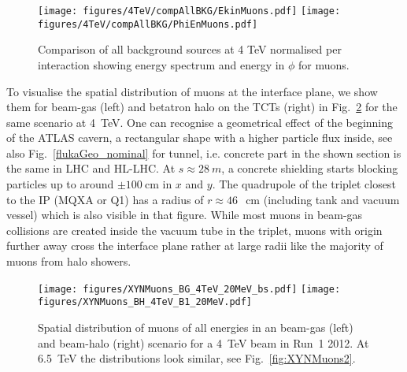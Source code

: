 \begin{figure}%
\begin{center}
  \texttt{[image: figures/4TeV/compAllBKG/EkinMuons.pdf]}
  \texttt{[image: figures/4TeV/compAllBKG/PhiEnMuons.pdf]}
\end{center}
\vspace{-0.6cm}
 \caption{Comparison of all background sources at 4 TeV normalised per interaction showing energy spectrum and energy in $\phi$ for muons.
  \label{fig:compAllBKG_muons}}
\end{figure}
To visualise the spatial distribution of muons at the interface plane, we show them for beam-gas (left) and betatron halo on the TCTs (right) in Fig.~\ref{fig:XYNMuons} for the same scenario at 4~TeV. One can recognise a geometrical effect of the beginning of the ATLAS cavern, a rectangular shape with a higher particle flux inside, see also Fig.~\ref{flukaGeo_nominal} for tunnel, i.e. concrete part in the shown section is the same in LHC and HL-LHC. At $s \approx 28~m$, a concrete shielding starts blocking particles up to around $\pm 100~$cm in $x$ and $y$. The quadrupole of the triplet closest to the IP (MQXA or Q1) has a radius of $r \approx 46~$~cm (including tank and vacuum vessel) which is also visible in that figure. While most muons in beam-gas collisions are created inside the vacuum tube in the triplet, muons with origin further away cross the interface plane rather at large radii like the majority of muons from halo showers.


\begin{figure} %
  \centering
  \texttt{[image: figures/XYNMuons\_BG\_4TeV\_20MeV\_bs.pdf]}
  \texttt{[image: figures/XYNMuons\_BH\_4TeV\_B1\_20MeV.pdf]}
  \caption{Spatial distribution of muons of all energies in an beam-gas (left) and beam-halo (right) scenario for a 4~TeV beam in Run~1 2012. At 6.5~TeV the distributions look similar, see Fig.~\ref{fig:XYNMuons2}.
    \label{fig:XYNMuons}}
\end{figure}


